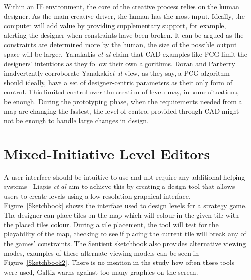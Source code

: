\documentclass[journal]{IEEEtran}
\begin{document}
Within an IE environment, the core of the creative process relies on the human designer. As the main creative driver, the human has the most input. Ideally, the computer will add value by providing supplementary support, for example, alerting the designer when constraints have been broken. It can be argued as the constraints are determined more by the human, the size of the possible output space will be larger. Yanakakis \textit{et al} \cite{yannakakis2014mixed} claim that CAD examples like PCG limit the designers' intentions as they follow their own algorithms. Doran and Parberry\cite{doran2010controlled} inadvertently corroborate Yanakaki\textit{et al}\cite{yannakakis2014mixed} view, as they say, a PCG algorithm should ideally, have a set of designer-centric parameters as their only form of control. This limited control over the creation of levels may, in some situations, be enough. During the prototyping phase, when the requirements needed from a map are changing the fastest, the level of control provided through CAD might not be enough to handle large changes in design. 

\section{Mixed-Initiative Level Editors } \label{UI}
A user interface should be intuitive to use and not require any additional helping systems \cite{oppermann2002user}. Liapis \textit{et al} \cite{liapis2013sentient} aim to achieve this by creating a design tool that allows users to create levels using a low-resolution graphical interface. Figure~\ref{Sketchbook} shows the interface used to design levels for a strategy game. The designer can place tiles on the map which will colour in the given tile with the placed tiles colour. During a tile placement, the tool will test for the playability of the map, checking to see if placing the current tile will break any of the games' constraints. The Sentient sketchbook also provides alternative viewing modes, examples of these alternate viewing models can be seen in Figure~\ref{Sketchbook2}. There is no mention in the study how often these tools were used, Galtiz \cite[p.~752]{galitz2007essential} warns against too many graphics on the screen.
\end{document}
